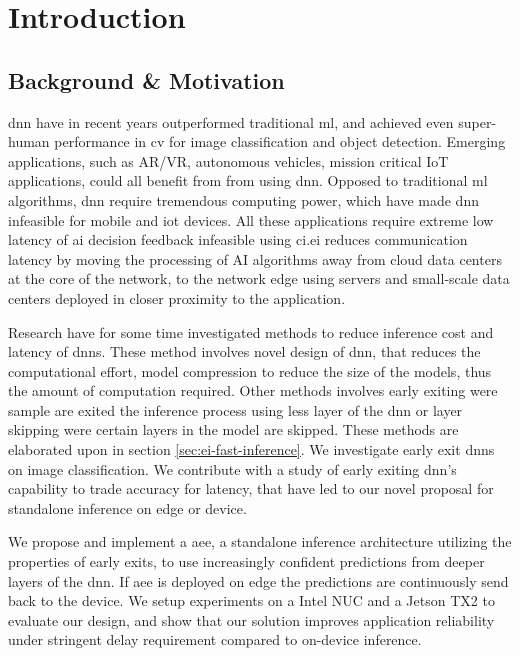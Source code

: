 \hypertarget{inroduction}{%
\chapter{Introduction}\label{ch:introduction}}
\thispagestyle{fancy}

\section{Background \& Motivation}

\gls{dnn} have in recent years outperformed traditional \gls{ml}, and achieved even super-human performance in \gls{cv} for image classification and object detection. Emerging applications, such as AR/VR, autonomous vehicles, mission critical IoT applications, could all benefit from from using \gls{dnn}. Opposed to traditional \gls{ml} algorithms, \gls{dnn} require tremendous computing power, which have made \gls{dnn} infeasible for mobile and \gls{iot} devices. All these applications require extreme low latency of \gls{ai} decision feedback infeasible using \gls{ci}.\acrlong{ei} reduces communication latency by moving the processing of AI algorithms away from cloud data centers at the core of the network, to the network edge using servers and small-scale data centers deployed in closer proximity to the application.

Research have for some time investigated methods to reduce inference cost and latency of \gls{dnn}s. These method involves novel design of \gls{dnn}, that reduces the computational effort, model compression to reduce the size of the models, thus the amount of computation required. Other methods involves early exiting were sample are exited the inference process using less layer of the \gls{dnn} or layer skipping were certain layers in the model are skipped. These methods are elaborated upon in section \ref{sec:ei-fast-inference}. We investigate early exit \gls{dnn}s on image classification. We contribute with a study of early exiting \gls{dnn}'s capability to trade accuracy for latency, that have led to our novel proposal for standalone inference on edge or device. 

We propose and implement a \gls{aee}, a standalone inference architecture utilizing the properties of early exits, to use increasingly confident predictions from deeper layers of the \gls{dnn}. If \gls{aee} is deployed on edge the predictions are continuously send back to the device. We setup experiments on a Intel NUC and a Jetson TX2 to evaluate our design, and show that our solution improves application reliability under stringent delay requirement compared to on-device inference. 

